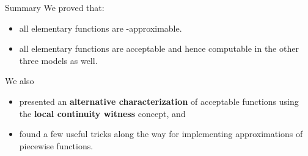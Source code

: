 \begin{frame}{Summary}
    We proved that:
    \pause
    \begin{itemize}
        \item all elementary functions are \WhileCC-approximable.
        \pause \item all elementary functions are acceptable
        \pause and hence computable in the other three models as well.
    \end{itemize}
     \pause We also 
    \begin{itemize}
         \item  presented an \textbf{alternative characterization} of acceptable functions \pause using the \textbf{local continuity witness} concept, and
         \item found a few useful tricks along the way for implementing approximations of piecewise functions.
    \end{itemize}
\end{frame}
